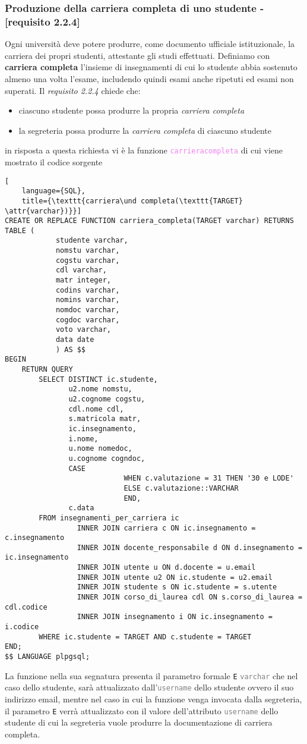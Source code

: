 \documentclass{article}
\newcommand{\attr}[1]{\texttt{\textcolor{gray}{#1}}}
\newcommand{\sqlfunc}[1]{\texttt{\textcolor{violet}{#1}}}
\newcommand{\und}[0]{\textunderscore}
\begin{document}
\subsubsection{Produzione della carriera completa di uno studente - [requisito 2.2.4]}
Ogni università deve potere produrre, come documento ufficiale istituzionale, la carriera dei propri studenti, attestante gli studi effettuati. Definiamo con \textbf{carriera completa} l'insieme di insegnamenti di cui lo studente abbia sostenuto almeno una volta l'esame, includendo quindi esami anche ripetuti ed esami non superati.
Il \textit{requisito 2.2.4} chiede che:
\begin{itemize}
    \item ciascuno studente possa produrre la propria \textit{carriera completa}
    \item la segreteria possa produrre la \textit{carriera completa} di ciascuno studente
\end{itemize}
in risposta a questa richiesta vi è la funzione \sqlfunc{carriera\und completa} di cui viene mostrato il codice sorgente
\begin{lstlisting}[
    language={SQL},
    title={\texttt{carriera\und completa(\texttt{TARGET} \attr{varchar})}}]
CREATE OR REPLACE FUNCTION carriera_completa(TARGET varchar) RETURNS TABLE (
            studente varchar,
            nomstu varchar,
            cogstu varchar,
            cdl varchar,
            matr integer,
            codins varchar,
            nomins varchar,
            nomdoc varchar,
            cogdoc varchar,
            voto varchar,
            data date
            ) AS $$
BEGIN
    RETURN QUERY
        SELECT DISTINCT ic.studente,
               u2.nome nomstu,
               u2.cognome cogstu,
               cdl.nome cdl,
               s.matricola matr,
               ic.insegnamento,
               i.nome,
               u.nome nomedoc,
               u.cognome cogndoc,
               CASE
                            WHEN c.valutazione = 31 THEN '30 e LODE'
                            ELSE c.valutazione::VARCHAR
                            END,
               c.data
        FROM insegnamenti_per_carriera ic
                 INNER JOIN carriera c ON ic.insegnamento = c.insegnamento
                 INNER JOIN docente_responsabile d ON d.insegnamento = ic.insegnamento
                 INNER JOIN utente u ON d.docente = u.email
                 INNER JOIN utente u2 ON ic.studente = u2.email
                 INNER JOIN studente s ON ic.studente = s.utente
                 INNER JOIN corso_di_laurea cdl ON s.corso_di_laurea = cdl.codice
                 INNER JOIN insegnamento i ON ic.insegnamento = i.codice
        WHERE ic.studente = TARGET AND c.studente = TARGET
END;
$$ LANGUAGE plpgsql;
\end{lstlisting}
La funzione nella sua segnatura presenta il parametro formale \texttt{E} \attr{varchar} che nel caso dello studente, sarà attualizzato dall'\attr{username} dello studente ovvero il suo indirizzo email, mentre nel caso in cui la funzione venga invocata dalla segreteria, il parametro \texttt{E} verrà attualizzato con il valore dell'attributo \attr{username} dello studente di cui la segreteria vuole produrre la documentazione di carriera completa.
\end{document}
